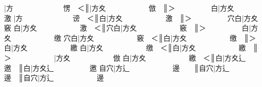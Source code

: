 {\cjk{}{\cnsym{}　　　　}}|{\cjk{}方{\cnsym{}　　　　　　　}愣{\cnsym{}　}＜}║{\cjk{}{\cnsym{}　　　　　　}}|{\cjk{}方夊{\cnsym{}　　　　　　}倣{\cnsym{}　}}║{\cjk{}＞{\cnsym{}　　　　　}白}|{\cjk{}方夊{\cnsym{}　　　　　　}激} 
{\cjk{}{\cnsym{}　　　　}}|{\cjk{}方{\cnsym{}　　　　　　　}谤{\cnsym{}　}＜}║{\cjk{}{\cnsym{}　　　　　}白}|{\cjk{}方夊{\cnsym{}　　　　　　}激{\cnsym{}　}}║{\cjk{}＞{\cnsym{}　　　　　}穴白}|{\cjk{}方夊{\cnsym{}　　　　　　}竅} 
{\cjk{}{\cnsym{}　　　　}白}|{\cjk{}方夊{\cnsym{}　　　　　　}激{\cnsym{}　}＜}║{\cjk{}{\cnsym{}　　　　　}穴白}|{\cjk{}方夊{\cnsym{}　　　　　　}竅{\cnsym{}　}}║{\cjk{}＞{\cnsym{}　　　　　}白}|{\cjk{}方夊{\cnsym{}　　　　　　}缴} 
{\cjk{}{\cnsym{}　　　　}穴白}|{\cjk{}方夊{\cnsym{}　　　　　　}竅{\cnsym{}　}＜}║{\cjk{}{\cnsym{}　　　　　}白}|{\cjk{}方夊{\cnsym{}　　　　　　}缴{\cnsym{}　}}║{\cjk{}＞{\cnsym{}　　　　　}白}|{\cjk{}方夊{\cnsym{}　　　　　　}繳} 
{\cjk{}{\cnsym{}　　　　}白}|{\cjk{}方夊{\cnsym{}　　　　　　}缴{\cnsym{}　}＜}║{\cjk{}{\cnsym{}　　　　　}白}|{\cjk{}方夊{\cnsym{}　　　　　　}繳{\cnsym{}　}}║{\cjk{}＞{\cnsym{}　　　　　　}}|{\cjk{}方夊{\cnsym{}　　　　　　}倣} 
{\cjk{}{\cnsym{}　　　　}白}|{\cjk{}方夊{\cnsym{}　　　　　　}繳{\cnsym{}　}＜}║{\cjk{}{\cnsym{}　　　　　　}白}|{\cjk{}方夊辶{\cnsym{}　　　　　}邀{\cnsym{}　}}║{\cjk{}{\cnsym{}　　　　　　　}白}|{\cjk{}方夊辶{\cnsym{}　　　　　}邀} 
{\cjk{}{\cnsym{}　　　　}自穴}|{\cjk{}方辶{\cnsym{}　　　　　　}邊{\cnsym{}　　}}║{\cjk{}{\cnsym{}　　　　　}自穴}|{\cjk{}方辶{\cnsym{}　　　　　　}邊{\cnsym{}　}}║{\cjk{}{\cnsym{}　　　　　　}自穴}|{\cjk{}方辶{\cnsym{}　　　　　　}邊} 
\endgroup{}{}

